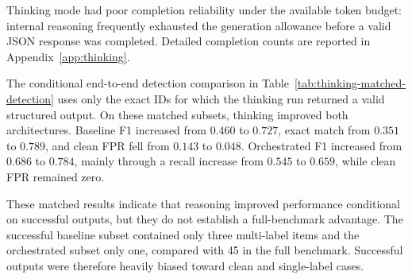 \documentclass[11pt,a4paper]{article}
\begin{document}
Thinking mode had poor completion reliability under the available token budget:
internal reasoning frequently exhausted the generation allowance before a valid
JSON response was completed. Detailed completion counts are reported in
Appendix~\ref{app:thinking}.

The conditional end-to-end detection comparison in
Table~\ref{tab:thinking-matched-detection} uses only the exact IDs for which the
thinking run returned a valid structured output. On these matched subsets,
thinking improved both architectures. Baseline F1 increased from $0.460$ to
$0.727$, exact match from $0.351$ to $0.789$, and clean FPR fell from $0.143$
to $0.048$. Orchestrated F1 increased from $0.686$ to $0.784$, mainly through
a recall increase from $0.545$ to $0.659$, while clean FPR remained zero.

\begin{table}[H]
\centering
\caption{Thinking versus non-thinking P2 detection on identical
         thinking-successful item IDs.}
\label{tab:thinking-matched-detection}
\small
\setlength{\tabcolsep}{4.0pt}
\end{table}

These matched results indicate that reasoning improved performance conditional
on successful outputs, but they do not establish a full-benchmark advantage.
The successful baseline subset contained only three multi-label items and the
orchestrated subset only one, compared with 45 in the full benchmark. Successful
outputs were therefore heavily biased toward clean and single-label cases.
\end{document}

